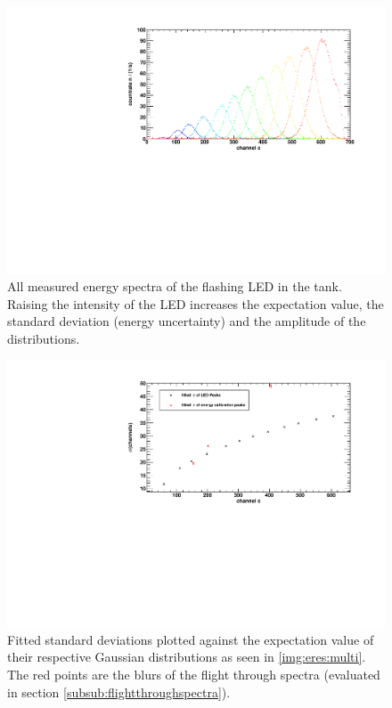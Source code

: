 \begin{figure}[H]
\begin{center}
  \includegraphics[width=\textwidth]{../img/energieaufloesung_multi.pdf}
  \caption{All measured energy spectra of the flashing LED in the tank.
  Raising the intensity of the LED increases the expectation value,
  the standard deviation (energy uncertainty) and the amplitude of the distributions.}
  \label{img:eres:multi}
\end{center}
\end{figure}


\begin{figure}[H]
\begin{center}
  \includegraphics[width=\textwidth]{../img/energieaufloesung_channels+ecal.pdf}
  \caption{Fitted standard deviations plotted against the expectation value of their respective Gaussian distributions as seen in 
  \autoref{img:eres:multi}. The red points are the blurs of the flight through spectra (evaluated in section \ref{subsub:flightthroughspectra}).}
  \label{img:eres:channels}
\end{center}
\end{figure}

